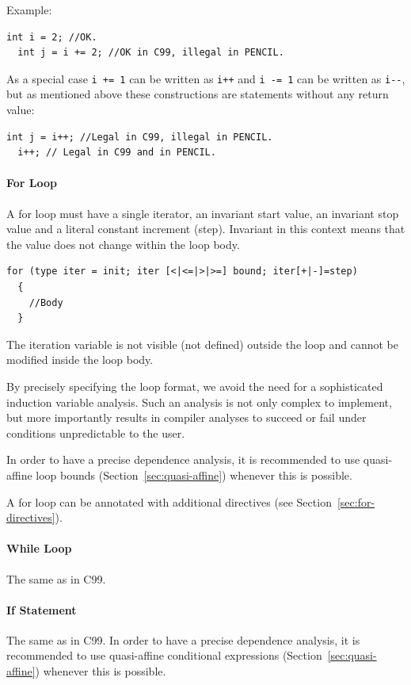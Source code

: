 Example:
\begin{lstlisting}[language=pencil]
  int i = 2; //OK.
  int j = i += 2; //OK in C99, illegal in PENCIL.
\end{lstlisting}

As a special case \lstinline!i += 1! can be written as \lstinline!i++!
and \lstinline!i -= 1! can be written as \lstinline!i--!, but as mentioned
above these constructions are statements without any return value:

\begin{lstlisting}[language=pencil]
  int j = i++; //Legal in C99, illegal in PENCIL.
  i++; // Legal in C99 and in PENCIL.
\end{lstlisting}

\paragraph{For Loop}

A \pencil for loop must have a single iterator, an invariant start
value, an invariant stop value and a literal constant increment (step).
Invariant in this context means that the value does not change within
the loop body.

\begin{lstlisting}[language=pencil]
  for (type iter = init; iter [<|<=|>|>=] bound; iter[+|-]=step)
  {
    //Body
  }
\end{lstlisting}
The iteration variable is not visible (not defined) outside the loop and cannot be modified
inside the loop body.

By precisely specifying the loop format, we avoid the need for
a sophisticated induction variable analysis.
Such an analysis is not only complex to implement, but more
importantly results in compiler analyses to succeed or fail under
conditions unpredictable to the user.

In order to have a precise dependence analysis, it is recommended
to use quasi-affine loop bounds (Section~\ref{sec:quasi-affine})
whenever this is possible.

A for loop can be annotated with additional directives
(see Section~\ref{sec:for-directives}).
\paragraph{While Loop}
The same as in C99.
\paragraph{If Statement}
The same as in C99.
In order to have a precise dependence analysis, it is recommended
to use quasi-affine conditional expressions (Section~\ref{sec:quasi-affine})
whenever this is possible.
